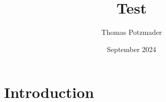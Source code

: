 \documentclass{article}
\title{Test}
\author{Thomas Potzmader }
\date{September 2024}
\begin{document}
\maketitle

\section{Introduction}
\end{document}

